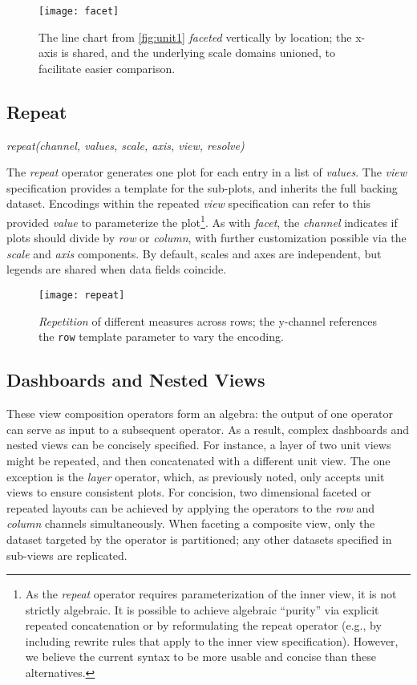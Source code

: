 \begin{figure*}[h!]
  \centering
  \texttt{[image: facet]}
  \caption{The line chart from \cref{fig:unit1} \emph{faceted}
  vertically by location; the x-axis is shared, and the underlying scale domains
  unioned, to facilitate easier comparison.}
  \label{fig:facet}
\end{figure*}

\subsection{Repeat}

\centerline{
  \emph{repeat(channel, values, scale, axis, view, resolve)}
}

The \emph{repeat} operator generates one plot for each entry in a list of
\emph{values}. The \emph{view} specification provides a template for the
sub-plots, and inherits the full backing dataset. Encodings within the
repeated \emph{view} specification can refer to this provided \emph{value} to
parameterize the plot\footnote{As the \emph{repeat} operator requires
parameterization of the inner view, it is not strictly algebraic. It is
possible to achieve algebraic ``purity'' via explicit repeated concatenation
or by reformulating the repeat operator (e.g., by including rewrite rules that
apply to the inner view specification). However, we believe the current syntax
to be more usable and concise than these alternatives.}. As with \emph{facet},
the \emph{channel} indicates if plots should divide by \emph{row} or
\emph{column}, with further customization possible via the \emph{scale} and
\emph{axis} components. By default, scales and axes are independent, but
legends are shared when data fields coincide.

\begin{figure*}[h!]
  \centering
  \texttt{[image: repeat]}
  \caption{\emph{Repetition} of different measures across rows; the y-channel
  references the \texttt{row} template parameter to vary the encoding.}
  \label{fig:repeat}
\end{figure*}

\subsection{Dashboards and Nested Views}

These view composition operators form an algebra: the output of one operator can
serve as input to a subsequent operator. As a result, complex dashboards and
nested views can be concisely specified. For instance, a layer of two unit views
might be repeated, and then concatenated with a different unit view. The one
exception is the \emph{layer} operator, which, as previously noted, only accepts
unit views to ensure consistent plots. For concision, two dimensional faceted or
repeated layouts can be achieved by applying the operators to the \emph{row} and
\emph{column} channels simultaneously. When faceting a composite view, only the
dataset targeted by the operator is partitioned; any other datasets specified in
sub-views are replicated.